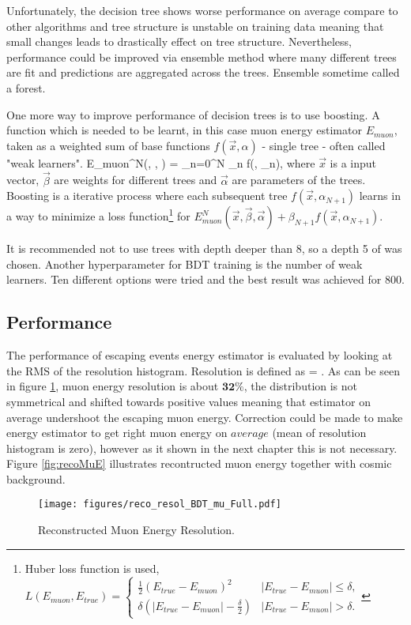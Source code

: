Unfortunately, the decision tree shows worse performance on average compare to other algorithms 
and tree structure is unstable on training data meaning that small changes leads to drastically 
effect on tree structure. Nevertheless, performance could be improved via ensemble method 
where many different trees are fit and predictions are aggregated across the trees. Ensemble 
sometime called a forest.

One more way to improve performance of decision trees is to use boosting. A function which is 
needed to be learnt, in this case muon energy estimator $E_{muon}$, taken as a weighted sum of 
base functions $f(\vec{x}, \alpha)$ - single tree - often called "weak learners". 
\be
E_{muon}^N(, \vec{\beta}, \vec{\alpha}) = \sum_{n=0}^N \beta_n f(, \alpha_n),
\ee
where $\vec{x}$ is a input vector, $\vec{\beta}$ are weights for different trees and $\vec{\alpha}$
are parameters of the trees. Boosting is a iterative process where each subsequent tree 
$f(\vec{x}, \alpha_{N+1})$ learns in a way to minimize a loss function\footnote{Huber loss function
is used,
$
L(E_{muon}, E_{true}) = \begin{cases}
				\frac{1}{2}(E_{true} - E_{muon})^2 & |E_{true} - E_{muon}| \leq \delta, \\
				\delta(|E_{true} - E_{muon}| - \frac{\delta}{2}) & |E_{true} - E_{muon}| > \delta.
			\end{cases}
$} for $E_{muon}^N(\vec{x}, \vec{\beta}, \vec{\alpha}) + \beta_{N+1}f(\vec{x}, \alpha_{N+1})$.

It is recommended not to use trees with depth deeper than 8, so a depth 5 of was chosen. Another 
hyperparameter for BDT training is the number of weak learners. Ten different options were tried
and the best result was achieved for 800.

\subsection{Performance}
The performance of escaping events energy estimator is evaluated by looking at the RMS of the 
resolution histogram. Resolution is defined as 
\be
{} = .
\ee
As can be seen in figure \ref{fig:recoMuE_resol}, muon energy resolution is about $\textbf{32\%}$, the 
distribution is not symmetrical and shifted towards positive values meaning that estimator on average 
undershoot the escaping muon energy. Correction could be made to make energy estimator to get right
muon energy on $\textit{average}$ (mean of resolution histogram is zero), however as it shown in the 
next chapter this is not necessary. Figure \ref{fig:recoMuE} illustrates recontructed muon energy together 
with cosmic background. 
\begin{figure}[!th]
\centering
\texttt{[image: figures/reco\_resol\_BDT\_mu\_Full.pdf]}
\caption{Reconstructed Muon Energy Resolution.}
\label{fig:recoMuE_resol}
\end{figure}

